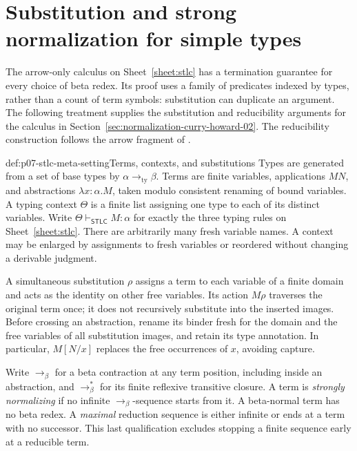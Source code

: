 \section{Substitution and strong normalization for simple types}
\label{sec:p07-stlc-metatheory}

The arrow-only calculus on Sheet~\ref{sheet:stlc} has a termination guarantee
for every choice of beta redex. Its proof uses a family of predicates indexed
by types, rather than a count of term symbols: substitution can duplicate an
argument. The following treatment supplies the substitution and reducibility
arguments for the calculus in Section~\ref{sec:normalization-curry-howard-02}.
The reducibility construction follows the arrow fragment of
\cite[Chapter~6]{GirardLafontTaylor2003Web}.

\begin{hbdefinition}{def:p07-stlc-meta-setting}{Terms, contexts, and substitutions}
Types are generated from a set of base types by
\(\alpha\mathbin{\to_{\mathrm{ty}}}\beta\). Terms are finite variables,
applications \(MN\), and abstractions \(\lambda x{:}\alpha.M\), taken
modulo consistent renaming of bound variables. A typing context \(\Theta\)
is a finite list assigning one type to each of its distinct variables.
Write \(\Theta\vdash_{\mathsf{STLC}}M:\alpha\) for exactly the three
typing rules on Sheet~\ref{sheet:stlc}. There are arbitrarily many fresh
variable names. A context may be enlarged by assignments to fresh variables
or reordered without changing a derivable judgment.

A simultaneous substitution \(\rho\) assigns a term to each variable of
a finite domain and acts as the identity on other free variables. Its action
\(M\rho\) traverses the original term once; it does not recursively
substitute into the inserted images. Before crossing an abstraction, rename
its binder fresh for the domain and the free variables of all substitution
images, and retain its type annotation. In particular, \(M[N/x]\) replaces
the free occurrences of \(x\), avoiding capture.

Write \(\to_\beta\) for a beta contraction at any term position, including
inside an abstraction, and \(\to_\beta^*\) for its finite reflexive
transitive closure. A term is \emph{strongly normalizing} if no infinite
\(\to_\beta\)-sequence starts from it. A beta-normal term has no beta
redex. A \emph{maximal} reduction sequence is either infinite or ends at a
term with no successor. This last qualification excludes stopping a finite
sequence early at a reducible term.
\end{hbdefinition}


